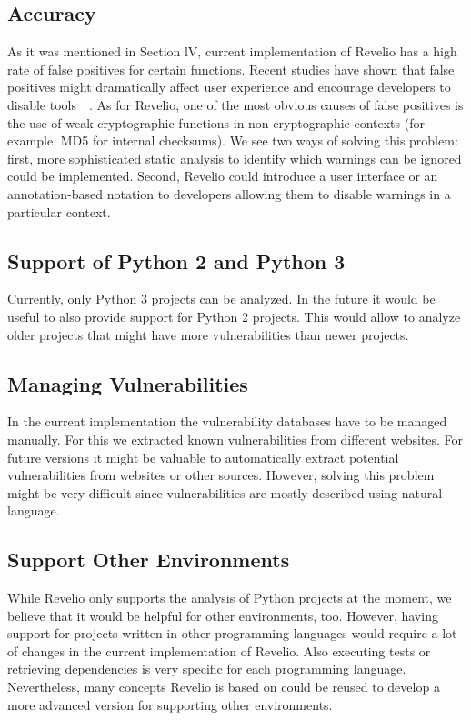 \subsection{Accuracy}
As it was mentioned in Section lV, current implementation of Revelio has a high rate of false positives for certain functions. Recent studies have shown that false positives might dramatically affect user experience and encourage developers to disable tools~\cite{park2016battles}~\cite{muske2015efficient}. As for Revelio, one of the most obvious causes of false positives is the use of weak cryptographic functions in non-cryptographic contexts (for example, MD5 for internal checksums). We see two ways of solving this problem: first, more sophisticated static analysis to identify which warnings can be ignored could be implemented. Second, Revelio could introduce a user interface or an annotation-based notation to developers allowing them to disable warnings in a particular context.

\subsection{Support of Python 2 and Python 3}

Currently, only Python 3 projects can be analyzed. In the future it would be useful to also provide support for Python 2 projects. This would allow to analyze older projects that might have more vulnerabilities than newer projects.

\subsection{Managing Vulnerabilities}
In the current implementation the vulnerability databases have to be managed manually. For this we extracted known vulnerabilities from different websites. For future versions it might be valuable to automatically extract potential vulnerabilities from websites or other sources. However, solving this problem might be very difficult since vulnerabilities are mostly described using natural language. 

\subsection{Support Other Environments}

While Revelio only supports the analysis of Python projects at the moment, we believe that it would be helpful for other environments, too. However, having support for projects written in other programming languages would require a lot of changes in the current implementation of Revelio. Also executing tests or retrieving dependencies is very specific for each programming language. Nevertheless, many concepts Revelio is based on could be reused to develop a more advanced version for supporting other environments.

